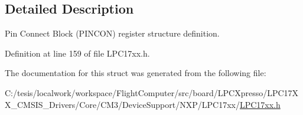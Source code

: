 \subsection{\-Detailed \-Description}
\-Pin \-Connect \-Block (\-P\-I\-N\-C\-O\-N) register structure definition. 

\-Definition at line 159 of file \-L\-P\-C17xx.\-h.



\-The documentation for this struct was generated from the following file\-:\begin{DoxyCompactItemize}
\item 
\-C\-:/tesis/localwork/workspace/\-Flight\-Computer/src/board/\-L\-P\-C\-Xpresso/\-L\-P\-C17\-X\-X\-\_\-\-C\-M\-S\-I\-S\-\_\-\-Drivers/\-Core/\-C\-M3/\-Device\-Support/\-N\-X\-P/\-L\-P\-C17xx/\hyperlink{_l_p_c17xx_8h}{\-L\-P\-C17xx.\-h}\end{DoxyCompactItemize}
